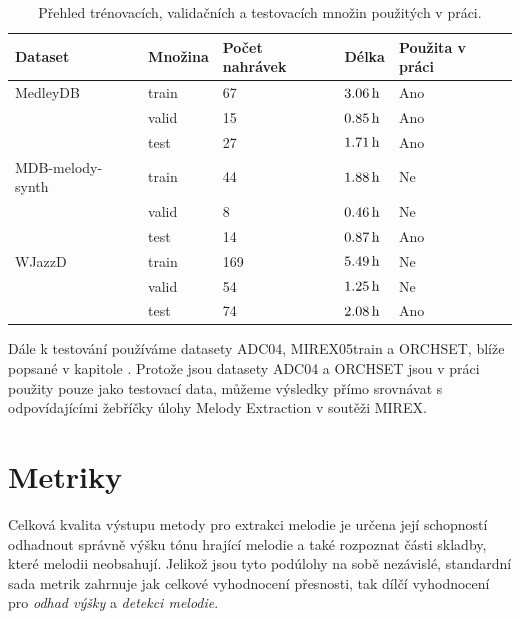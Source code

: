 \begin{table}[h!]
\centering
\begin{tabular}{lllll}
\toprule
Dataset          & Množina & Počet nahrávek & Délka & Použita v práci \\
\midrule
MedleyDB         & train   & 67             & $3.06\,\rm h$ & Ano \\
                 & valid   & 15             & $0.85\,\rm h$ & Ano \\
                 & test    & 27             & $1.71\,\rm h$ & Ano \\
MDB-melody-synth & train   & 44             & $1.88\,\rm h$ & Ne \\
                 & valid   & 8              & $0.46\,\rm h$ & Ne \\
                 & test    & 14             & $0.87\,\rm h$ & Ano \\
WJazzD           & train   & 169            & $5.49\,\rm h$ & Ne \\
                 & valid   & 54             & $1.25\,\rm h$ & Ne \\
                 & test    & 74             & $2.08\,\rm h$ & Ano \\
\bottomrule
\end{tabular}
\caption{Přehled trénovacích, validačních a testovacích množin použitých v práci.}\label{tab:data_splits}
\end{table}

Dále k testování používáme datasety ADC04, MIREX05train a ORCHSET, blíže popsané v kapitole . Protože jsou datasety ADC04 a ORCHSET jsou v práci použity pouze jako testovací data, můžeme výsledky přímo srovnávat s odpovídajícími žebříčky úlohy Melody Extraction v soutěži MIREX.




\section{Metriky}

Celková kvalita výstupu metody pro extrakci melodie je určena její schopností odhadnout správně výšku tónu hrající melodie a také rozpoznat části skladby, které melodii neobsahují. Jelikož jsou tyto podúlohy na sobě nezávislé, standardní sada metrik zahrnuje jak celkové vyhodnocení přesnosti, tak dílčí vyhodnocení pro \textit{odhad výšky} a \textit{detekci melodie}. 

